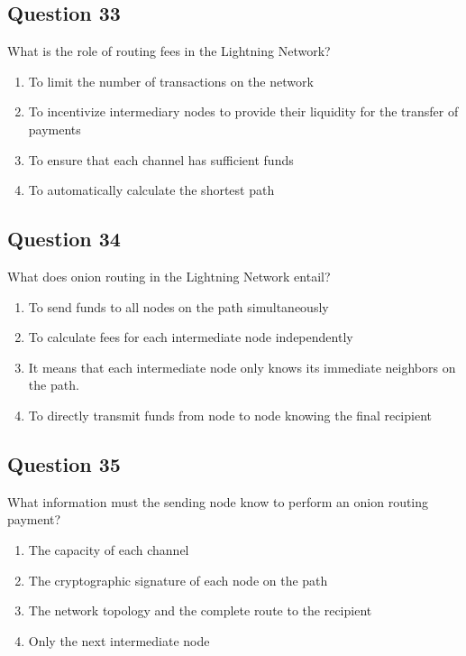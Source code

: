 \documentclass[12pt,a4paper]{article}
\begin{document}
\bigskip


\subsection*{Question 33}
What is the role of routing fees in the Lightning Network?

\begin{enumerate}[label=\Alph*., leftmargin=*]
\item To limit the number of transactions on the network
\item To incentivize intermediary nodes to provide their liquidity for the transfer of payments
\item To ensure that each channel has sufficient funds
\item To automatically calculate the shortest path
\end{enumerate}

\bigskip


\subsection*{Question 34}
What does onion routing in the Lightning Network entail?

\begin{enumerate}[label=\Alph*., leftmargin=*]
\item To send funds to all nodes on the path simultaneously
\item To calculate fees for each intermediate node independently
\item It means that each intermediate node only knows its immediate neighbors on the path.
\item To directly transmit funds from node to node knowing the final recipient
\end{enumerate}

\bigskip


\subsection*{Question 35}
What information must the sending node know to perform an onion routing payment?

\begin{enumerate}[label=\Alph*., leftmargin=*]
\item The capacity of each channel
\item The cryptographic signature of each node on the path
\item The network topology and the complete route to the recipient
\item Only the next intermediate node
\end{enumerate}
\end{document}
